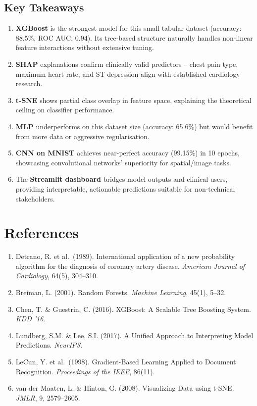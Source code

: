 \documentclass[12pt,a4paper]{article}
\begin{document}
\subsection{Key Takeaways}

\begin{enumerate}
    \item \textbf{XGBoost} is the strongest model for this small tabular dataset (accuracy: 88.5\%, ROC AUC: 0.94). Its tree-based structure naturally handles non-linear feature interactions without extensive tuning.
    \item \textbf{SHAP} explanations confirm clinically valid predictors -- chest pain type, maximum heart rate, and ST depression align with established cardiology research.
    \item \textbf{t-SNE} shows partial class overlap in feature space, explaining the theoretical ceiling on classifier performance.
    \item \textbf{MLP} underperforms on this dataset size (accuracy: 65.6\%) but would benefit from more data or aggressive regularisation.
    \item \textbf{CNN on MNIST} achieves near-perfect accuracy (99.15\%) in 10 epochs, showcasing convolutional networks' superiority for spatial/image tasks.
    \item The \textbf{Streamlit dashboard} bridges model outputs and clinical users, providing interpretable, actionable predictions suitable for non-technical stakeholders.
\end{enumerate}

\section*{References}

\begin{enumerate}
    \item Detrano, R. et al.\ (1989). International application of a new probability algorithm for the diagnosis of coronary artery disease. \textit{American Journal of Cardiology}, 64(5), 304--310.
    \item Breiman, L. (2001). Random Forests. \textit{Machine Learning}, 45(1), 5--32.
    \item Chen, T. \& Guestrin, C. (2016). XGBoost: A Scalable Tree Boosting System. \textit{KDD '16}.
    \item Lundberg, S.M. \& Lee, S.I. (2017). A Unified Approach to Interpreting Model Predictions. \textit{NeurIPS}.
    \item LeCun, Y. et al.\ (1998). Gradient-Based Learning Applied to Document Recognition. \textit{Proceedings of the IEEE}, 86(11).
    \item van der Maaten, L. \& Hinton, G. (2008). Visualizing Data using t-SNE. \textit{JMLR}, 9, 2579--2605.
\end{enumerate}
\end{document}
